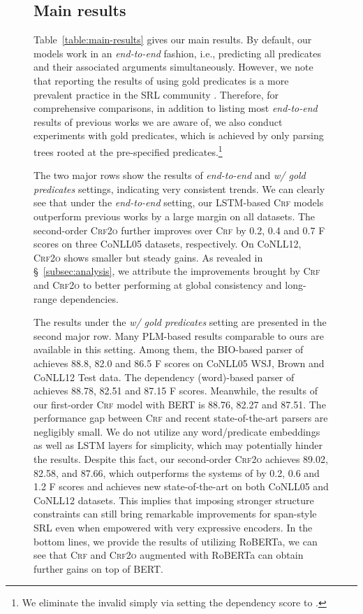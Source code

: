 \documentclass[11pt]{article}
\begin{document}
\begin{figure}[tb!]
\subsection{Main results}\label{subsec:results}
Table~\ref{table:main-results} gives our main results.
By default, our models work in an \emph{end-to-end} fashion, i.e., predicting all predicates and their associated arguments simultaneously.
However, we note that reporting the results of using gold predicates is a more prevalent practice in the SRL community \cite{he-etal-2018-jointly,shi-etal-2019-simple}.
Therefore, for comprehensive comparisons, in addition to listing most \emph{end-to-end} results of previous works we are aware of, we also conduct experiments with gold predicates, which is achieved by only parsing trees rooted at the pre-specified predicates.\footnote{We eliminate the invalid  simply via setting the dependency score to .}

The two major rows show the results of \emph{end-to-end} and \emph{w/ gold predicates} settings, indicating very consistent trends.
We can clearly see that under the \emph{end-to-end} setting, our LSTM-based \textsc{Crf} models outperform previous works by a large margin on all datasets.
The second-order \textsc{Crf2o} further improves over \textsc{Crf} by 0.2, 0.4 and 0.7 F scores on three CoNLL05 datasets, respectively.
On CoNLL12, \textsc{Crf2o} shows smaller but steady gains.
As revealed in \S~\ref{subsec:analysis}, we attribute the improvements brought by \textsc{Crf} and \textsc{Crf2o} to better performing at global consistency and long-range dependencies.

The results under the \emph{w/ gold predicates} setting are presented in the second major row.
Many PLM-based results comparable to ours are available in this setting.
Among them, the BIO-based parser of \citet{shi-etal-2019-simple} achieves 88.8, 82.0 and 86.5 F scores on CoNLL05 WSJ, Brown and CoNLL12 Test data.
The dependency (word)-based parser of \citet{zhou-etal-2022-fast} achieves 88.78,  82.51 and 87.15 F scores.
Meanwhile, the results of our first-order \textsc{Crf} model with BERT is 88.76, 82.27 and 87.51.
The performance gap between \textsc{Crf} and recent state-of-the-art parsers are negligibly small.
We do not utilize any word/predicate embeddings as well as LSTM layers for simplicity, which may potentially hinder the results.
Despite this fact, our second-order \textsc{Crf2o} achieves 89.02, 82.58, and 87.66, which outperforms the systems of \citet{shi-etal-2019-simple} by 0.2, 0.6 and 1.2 F scores and achieves new state-of-the-art on both CoNLL05 and CoNLL12 datasets.
This implies that imposing stronger structure constraints can still bring remarkable improvements for span-style SRL even when empowered with very expressive encoders.
In the bottom lines, we provide the results of utilizing RoBERTa, we can see that \textsc{Crf} and \textsc{Crf2o} augmented with RoBERTa can obtain further gains on top of BERT.


\end{figure}
\end{document}
